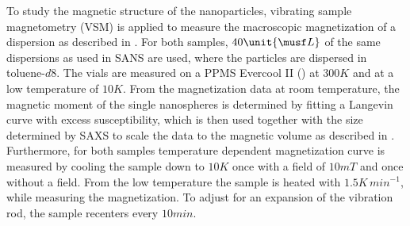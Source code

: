 \documentclass[\main/dresen_thesis.tex]{subfiles}
\begin{document}
    To study the magnetic structure of the nanoparticles, vibrating sample magnetometry (VSM) is applied to measure the macroscopic magnetization of a dispersion as described in .
    For both samples, $40 \unit{\musf L}$ of the same dispersions as used in SANS are used, where the particles are dispersed in toluene-$\mathit{d8}$.
    The vials are measured on a PPMS Evercool II () at $300 \unit{K}$ and at a low temperature of $10 \unit{K}$.
    From the magnetization data at room temperature, the magnetic moment of the single nanospheres is determined by fitting a Langevin curve with excess susceptibility, which is then used together with the size determined by SAXS to scale the data to the magnetic volume as described in .
    Furthermore, for both samples temperature dependent magnetization curve is measured by cooling the sample down to $10 \unit{K}$ once with a field of $10 \unit{mT}$ and once without a field.
    From the low temperature the sample is heated with $1.5 \unit{K \, min^{-1}}$, while measuring the magnetization.
    To adjust for an expansion of the vibration rod, the sample recenters every $10 \unit{min}$.
\end{document}
